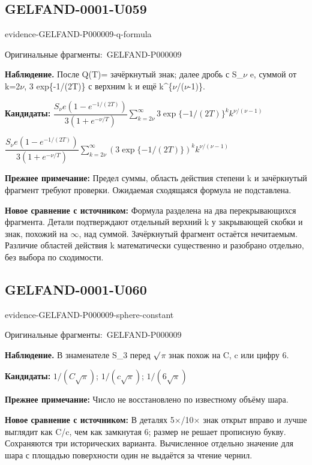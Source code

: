\documentclass[11pt]{article}
\newcommand{\EvidenceBlock}[4]{%
 \par\smallskip\noindent\begin{minipage}{\linewidth}
 \begin{minipage}[t]{.47\linewidth}\vspace{0pt}\centering
 \csname evidence-#1-#2\endcsname\par
 {\scriptsize\SourceCropCaption\ #1}\par
 \end{minipage}\hfill
 \begin{minipage}[t]{.49\linewidth}\vspace{0pt}\raggedright
 {\small\color{orange!65!black}\textbf{#4} #3}\par
 \end{minipage}
 \end{minipage}\par\smallskip}
\newcommand{\SourceCropCaption}{Оригинальные фрагменты:}\newcommand{\ReadingCaption}{Сомнительное чтение.}\newcommand{\IncompleteCaption}{Неразобранный фрагмент.}\newcommand{\DiagramCaption}{Рисунок и набранное описание.}
\begin{document}
\subsection*{GELFAND-0001-U059}
\EvidenceBlock{GELFAND-P000009}{q-formula}{После Q(T)= зачёркнутый знак; далее дробь с S\_\(\nu\) e, суммой от k=2\(\nu\), 3 exp\{-1/(2T)\} с верхним k и ещё k\textasciicircum{}\{\(\nu\)/(\(\nu\)-1)\}.}{Наблюдение.}
\par\smallskip\noindent\textbf{Кандидаты: } \(\dfrac{S_\nu e(1-e^{-1/(2T)})}{3(1+e^{-\nu/T})}\sum_{k=2\nu}^{\infty}3\exp\{-1/(2T)\}^k k^{\nu/(\nu-1)}\)\par\smallskip\(\dfrac{S_\nu e(1-e^{-1/(2T)})}{3(1+e^{-\nu/T})}\sum_{k=2\nu}^{\infty}(3\exp\{-1/(2T)\})^k k^{\nu/(\nu-1)}\)\par
\par\smallskip\noindent\textbf{Прежнее примечание: } Предел суммы, область действия степени k и зачёркнутый фрагмент требуют проверки. Ожидаемая сходящаяся формула не подставлена.\par
\par\smallskip\noindent\textbf{Новое сравнение с источником: } Формула разделена на два перекрывающихся фрагмента. Детали подтверждают отдельный верхний k у закрывающей скобки и знак, похожий на \(\infty\), над суммой. Зачёркнутый фрагмент остаётся нечитаемым. Различие областей действия k математически существенно и разобрано отдельно, без выбора по сходимости.\par

\subsection*{GELFAND-0001-U060}
\EvidenceBlock{GELFAND-P000009}{sphere-constant}{В знаменателе S\_3 перед \(\sqrt{\vphantom{x}}\)\(\pi\) знак похож на C, c или цифру 6.}{Наблюдение.}
\par\smallskip\noindent\textbf{Кандидаты: } \(1/(C\sqrt\pi)\); \(1/(c\sqrt\pi)\); \(1/(6\sqrt\pi)\)\par
\par\smallskip\noindent\textbf{Прежнее примечание: } Число не восстановлено по известному объёму шара.\par
\par\smallskip\noindent\textbf{Новое сравнение с источником: } В деталях 5×/10× знак открыт вправо и лучше выглядит как C/c, чем как замкнутая 6; размер не решает прописную букву. Сохраняются три исторических варианта. Вычисленное отдельно значение для шара с площадью поверхности один не выдаётся за чтение чернил.\par
\end{document}
